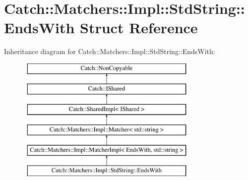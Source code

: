 \hypertarget{struct_catch_1_1_matchers_1_1_impl_1_1_std_string_1_1_ends_with}{\section{Catch\-:\-:Matchers\-:\-:Impl\-:\-:Std\-String\-:\-:Ends\-With Struct Reference}
\label{struct_catch_1_1_matchers_1_1_impl_1_1_std_string_1_1_ends_with}
}
Inheritance diagram for Catch\-:\-:Matchers\-:\-:Impl\-:\-:Std\-String\-:\-:Ends\-With\-:\begin{figure}[H]
\begin{center}
\leavevmode
\includegraphics[height=6.000000cm]{struct_catch_1_1_matchers_1_1_impl_1_1_std_string_1_1_ends_with}
\end{center}
\end{figure}

